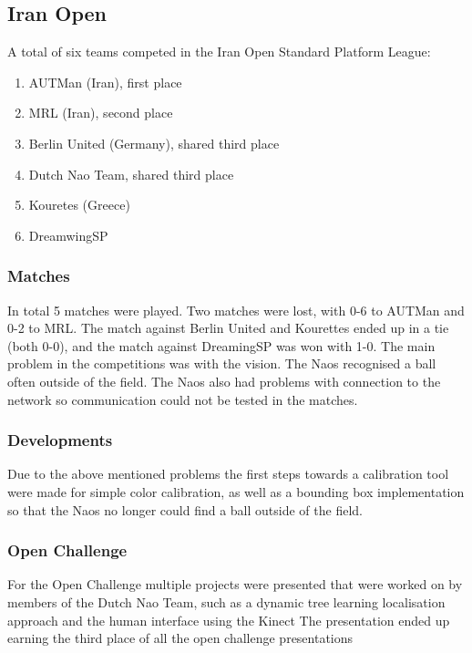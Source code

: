 \documentclass[a4paper]{article}
\begin{document}
\subsection{Iran Open}

A total of six teams competed in the Iran Open Standard Platform League:
\begin{enumerate}
\item AUTMan (Iran), first place
\item MRL (Iran), second place
\item Berlin United (Germany), shared third place
\item Dutch Nao Team, shared third place
\item Kouretes (Greece)
\item DreamwingSP
\end{enumerate}

\subsubsection{Matches}
In total 5 matches were played. Two matches were lost, with 0-6 to AUTMan and 0-2 to MRL. The match against Berlin United and Kourettes ended up in a tie (both 0-0), and the match against DreamingSP was won with 1-0.
The main problem in the competitions was with the vision. The Naos recognised a ball often outside of the field. The Naos also had problems with connection to the network so communication could not be tested in the matches.

\subsubsection{Developments}
Due to the above mentioned problems the first steps towards a calibration tool were made for simple color calibration, as well as a bounding box implementation so that the Naos no longer could find a ball outside of the field.

\subsubsection{Open Challenge}
For the Open Challenge multiple projects were presented that were worked on by members of the Dutch Nao Team, such as a dynamic tree learning localisation approach and the human interface using the Kinect\cite{DutchNaoTeamTech11}
The presentation ended up earning the third place of all the open challenge presentations
\end{document}
